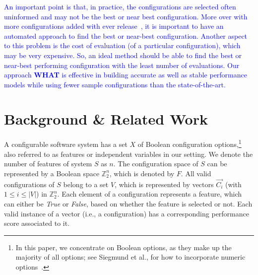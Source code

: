 \documentclass[smallextended]{svjour3}       %
\newcommand{\what}{{\bf WHAT}\xspace}
\begin{document}
\textcolor{blue}{
An important point is that, in practice, the configurations are selected often uninformed and may not be the best or near best configuration. More over with more configurations added with ever release~\cite{xu2015hey}, it is important to have an automated approach to find the best or near-best configuration. Another aspect to this problem is the cost of evaluation (of a particular configuration), which may be very expensive. So, an ideal method should be able to find the best or near-best performing configuration with the least number of evaluations. Our approach \what{} is effective in building accurate as well as stable performance models while using fewer sample configurations than the state-of-the-art. }
 
\section{Background \& Related Work}  
\label{sect:addit}

A configurable software system has a set $X$ of Boolean configuration options,\footnote{In this paper, we concentrate on Boolean options, as they make up the majority of all options; see Siegmund et al., for how to incorporate numeric options~\cite{SGA+15}.} also referred to as features or independent variables in our setting.
We denote the number of features of system $S$ as $n$. The configuration space of $S$ can be represented by a Boolean space $\mathbb{Z}_{2}^{n}$, which is denoted by $F$. All valid configurations of $S$ belong to a set $V$, 
which is represented by vectors $\vec{C_i}$ (with $1\leq i\leq \left\vert{V}\right\vert$) in $\mathbb{Z}_{2}^{n}$. Each element of a configuration represents a feature, which can either be \emph{True} or \emph{False}, based on whether the feature is selected or not. 
Each valid instance of a vector (i.e., a configuration) has a corresponding performance score associated to it. 
\end{document}
